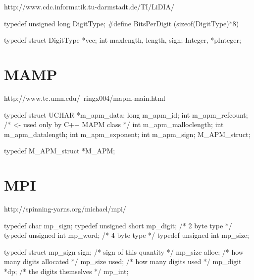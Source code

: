 \documentclass{article}
\begin{document}
http://www.cdc.informatik.tu-darmstadt.de/TI/LiDIA/

\begin{verbatimtab}
typedef unsigned long   DigitType;
#define BitsPerDigit    (sizeof(DigitType)*8)

typedef struct {
    DigitType   *vec;
    int         maxlength, length, sign;
}               Integer, *pInteger;
\end{verbatimtab}

\section{MAMP}

http://www.tc.umn.edu/~ringx004/mapm-main.html

\begin{verbatimtab}
typedef struct  {
    UCHAR   *m_apm_data;
    long    m_apm_id;
    int     m_apm_refcount;       /* <- used only by C++ MAPM class */
    int m_apm_malloclength;
    int m_apm_datalength;
    int m_apm_exponent;
    int m_apm_sign;
} M_APM_struct;

typedef M_APM_struct *M_APM;
\end{verbatimtab}

\section{MPI}

http://spinning-yarns.org/michael/mpi/

\begin{verbatimtab}
typedef char               mp_sign;
typedef unsigned short     mp_digit;  /* 2 byte type */
typedef unsigned int       mp_word;   /* 4 byte type */
typedef unsigned int       mp_size;

typedef struct {
  mp_sign       sign;    /* sign of this quantity      */
  mp_size       alloc;   /* how many digits allocated  */
  mp_size       used;    /* how many digits used       */
  mp_digit     *dp;      /* the digits themselves      */
} mp_int;
\end{verbatimtab}
\end{document}
